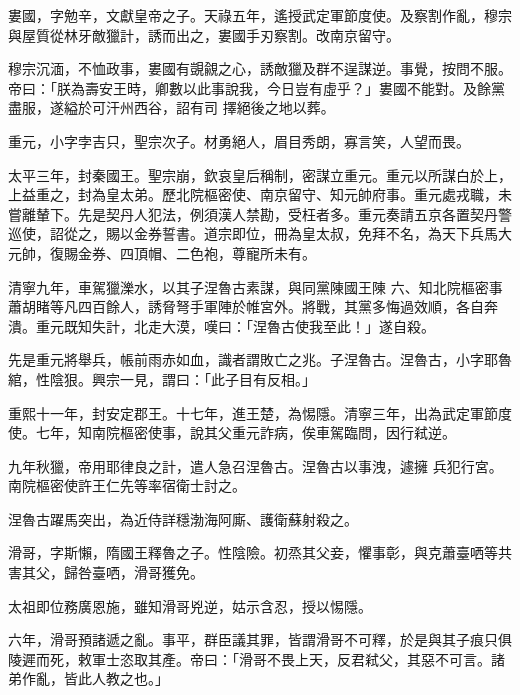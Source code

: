 \begin{pinyinscope}
 婁國，字勉辛，文獻皇帝之子。天祿五年，遙授武定軍節度使。及察割作亂，穆宗與屋質從林牙敵獵計，誘而出之，婁國手刃察割。改南京留守。



 穆宗沉湎，不恤政事，婁國有覬覦之心，誘敵獵及群不逞謀逆。事覺，按問不服。帝曰：「朕為壽安王時，卿數以此事說我，今日豈有虛乎？」婁國不能對。及餘黨盡服，遂縊於可汗州西谷，詔有司
 擇絕後之地以葬。



 重元，小字孛吉只，聖宗次子。材勇絕人，眉目秀朗，寡言笑，人望而畏。



 太平三年，封秦國王。聖宗崩，欽哀皇后稱制，密謀立重元。重元以所謀白於上，上益重之，封為皇太弟。歷北院樞密使、南京留守、知元帥府事。重元處戎職，未嘗離輦下。先是契丹人犯法，例須漢人禁勘，受枉者多。重元奏請五京各置契丹警巡使，詔從之，賜以金券誓書。道宗即位，冊為皇太叔，免拜不名，為天下兵馬大元帥，復賜金券、四頂帽、二色袍，尊寵所未有。



 清寧九年，車駕獵濼水，以其子涅魯古素謀，與同黨陳國王陳
 六、知北院樞密事蕭胡睹等凡四百餘人，誘脅弩手軍陣於帷宮外。將戰，其黨多悔過效順，各自奔潰。重元既知失計，北走大漠，嘆曰：「涅魯古使我至此！」遂自殺。



 先是重元將舉兵，帳前雨赤如血，識者謂敗亡之兆。子涅魯古。涅魯古，小字耶魯綰，性陰狠。興宗一見，謂曰：「此子目有反相。」



 重熙十一年，封安定郡王。十七年，進王楚，為惕隱。清寧三年，出為武定軍節度使。七年，知南院樞密使事，說其父重元詐病，俟車駕臨問，因行弒逆。



 九年秋獵，帝用耶律良之計，遣人急召涅魯古。涅魯古以事洩，遽擁
 兵犯行宮。南院樞密使許王仁先等率宿衛士討之。



 涅魯古躍馬突出，為近侍詳穩渤海阿廝、護衛蘇射殺之。



 滑哥，字斯懶，隋國王釋魯之子。性陰險。初烝其父妾，懼事彰，與克蕭臺哂等共害其父，歸咎臺哂，滑哥獲免。



 太祖即位務廣恩施，雖知滑哥兇逆，姑示含忍，授以惕隱。



 六年，滑哥預諸遞之亂。事平，群臣議其罪，皆謂滑哥不可釋，於是與其子痕只俱陵遲而死，敕軍士恣取其產。帝曰：「滑哥不畏上天，反君弒父，其惡不可言。諸弟作亂，皆此人教之也。」



\end{pinyinscope}